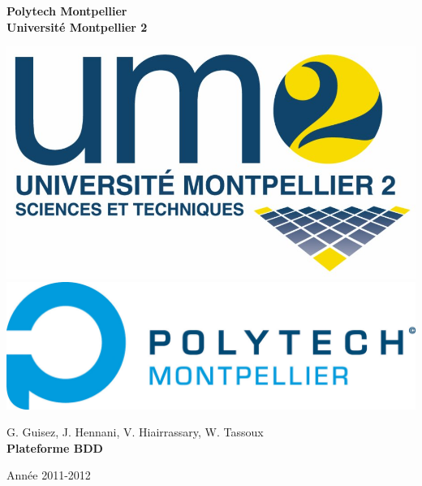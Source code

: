 \setcounter{page}{0}

\begin{minipage}{0.5\linewidth} %
\textbf{Polytech Montpellier}\\ 
\textbf{Université Montpellier 2}\\
\end{minipage}
\begin{minipage}{0.5\linewidth}
\begin{flushright}
\includegraphics[scale=0.1]{images/logoUm2.jpg}
\includegraphics[scale=0.3]{images/logoPolytech.jpg}
\end{flushright}
\end{minipage}


\vspace{8cm}


\begin{center}
\LARGE G. Guisez, J. Hennani, V. Hiairrassary, W. Tassoux\\
\vspace{2cm}
\huge \textbf{Plateforme BDD}\\
\end{center}


\vspace{8cm}


\noindent %
Année 2011-2012
